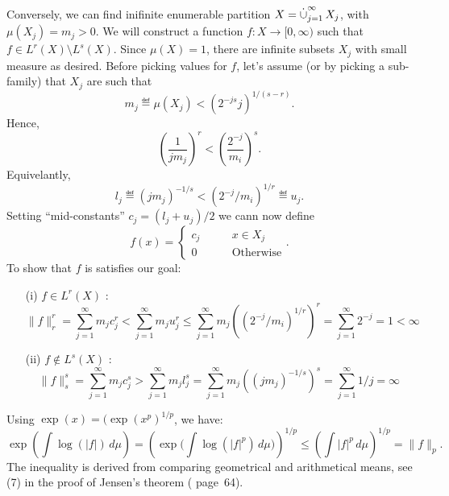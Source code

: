 \begin{enumerate}
\begin{itemize}
Conversely, we can find inifinite enumerable partition
\(X=\disjunion_{j=1}^\infty X_j\), with \(\mu(X_j) = m_j > 0\).
We will construct a function \(f:X\to [0,\infty)\) such that
\(f\in L^r(X)\setminus L^s(X)\).
Since \(\mu(X)=1\), there are infinite subsets \(X_j\) with small measure
as desired.
Before picking values for $f$,
let's assume (or by picking a sub-family) that \(X_j\) are such that
\begin{equation*} \label{eq:LrLs:mj}
m_j \eqdef \mu(X_j) < (2^{-js} j)^{1/(s-r)}.
\end{equation*}
Hence,
\begin{equation*}
\left(\frac{1}{jm_j}\right)^r < \left(\frac{2^{-j}}{m_i}\right)^s.
\end{equation*}
Equivelantly,
\begin{equation}
l_j \eqdef (j m_j)^{-1/s} < \left(2^{-j}/m_i\right)^{1/r} \eqdef u_j.
\end{equation}
Setting ``mid-constants'' \(c_j = (l_j + u_j)/2\) we cann now define
\begin{equation*}
f(x) = \left\{ \begin{array}{ll}
               c_j \qquad & x\in X_j \\
               0          & \textrm{Otherwise}
               \end{array}\right..
\end{equation*}
To show that $f$ is satisfies our goal:
\begin{itemize}

\item[(i)] \(f\in L^r(X)\) \quad:
\begin{equation*}
\|f\|_r^r
 = \sum_{j=1}^\infty m_j c_j^r
 <  \sum_{j=1}^\infty m_j u_j^r
 \leq \sum_{j=1}^\infty m_j \left(\left(2^{-j}/m_i\right)^{1/r}\right)^r
 = \sum_{j=1}^\infty 2^{-j} = 1 < \infty
\end{equation*}

\item[(ii)] \(f\notin L^s(X)\) \quad:
\begin{equation*}
\|f\|_s^s
 = \sum_{j=1}^\infty m_j c_j^s
 >  \sum_{j=1}^\infty m_j l_j^s
 = \sum_{j=1}^\infty m_j \left((j m_j)^{-1/s} \right)^s
 = \sum_{j=1}^\infty 1/j = \infty
\end{equation*}

\end{itemize}

 Using \(\exp(x)=(\exp(x^p)^{1/p}\), we have:
 \begin{equation*}
  \exp\left(\int\log(|f|)\,d\mu\right)
   = \left(\exp\bigl(\int\log(|f|^p)\,d\mu\bigr)\right)^{1/p}
   \leq \left(\int|f|^p\,d\mu\right)^{1/p} = \|f\|_p.
 \end{equation*}
 The inequality is derived from comparing geometrical and arithmetical means,
 see (7) in the proof of  Jensen's theorem
 (\cite{RudinRCA80}  page~64).


\end{itemize}
\end{enumerate}
